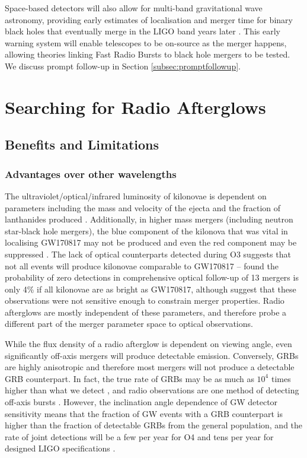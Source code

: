 Space-based detectors will also allow for multi-band gravitational wave astronomy, providing early estimates of localisation and merger time for binary black holes that eventually merge in the LIGO band years later \citep{2016PhRvL.116w1102S}. This early warning system will enable telescopes to be on-source as the merger happens, allowing theories linking Fast Radio Bursts \citep[FRB;][]{2007Sci...318..777L,2013Sci...341...53T} to black hole mergers \citep[e.g.][]{2016ApJ...827L..31Z,2016ApJ...826...82L} to be tested. We discuss prompt follow-up in Section \ref{subsec:promptfollowup}.

\vspace{-5pt}
\section{Searching for Radio Afterglows}
\label{sec:prospects}
\vspace{-5pt}
\subsection{Benefits and Limitations}
\subsubsection{Advantages over other wavelengths}
The ultraviolet/optical/infrared luminosity of kilonovae is dependent on parameters including the mass and velocity of the ejecta and the fraction of lanthanides produced \citep[e.g. see][and references therein]{2017LRR....20....3M}. Additionally, in higher mass mergers (including neutron star-black hole mergers), the blue component of the kilonova that was vital in localising GW170817 may not be produced and even the red component may be suppressed \citep{2013ApJ...778L..16H,2017Natur.551...80K}. The lack of optical counterparts detected during O3 suggests that not all events will produce kilonovae comparable to GW170817 -- \citet{2020arXiv200611306K} found the probability of zero detections in comprehensive optical follow-up of 13 mergers is only 4\% if all kilonovae are as bright as GW170817, although \citet{2020arXiv200614756C} suggest that these observations were not sensitive enough to constrain merger properties. Radio afterglows are mostly independent of these parameters, and therefore probe a different part of the merger parameter space to optical observations.

While the flux density of a radio afterglow is dependent on viewing angle, even significantly off-axis mergers will produce detectable emission. Conversely, GRBs are highly anisotropic and therefore most mergers will not produce a detectable GRB counterpart. In fact, the true rate of GRBs may be as much as $10^4$ times higher than what we detect \citep{2006ApJ...638..930S}, and radio observations are one method of detecting off-axis bursts \citep{2002ApJ...576..923L}. However, the inclination angle dependence of GW detector sensitivity means that the fraction of GW events with a GRB counterpart is higher than the fraction of detectable GRBs from the general population, and the rate of joint detections will be a few per year for O4 and tens per year for designed LIGO specifications \citep{2019MNRAS.485.1435H,2020MNRAS.493.1633S}.

